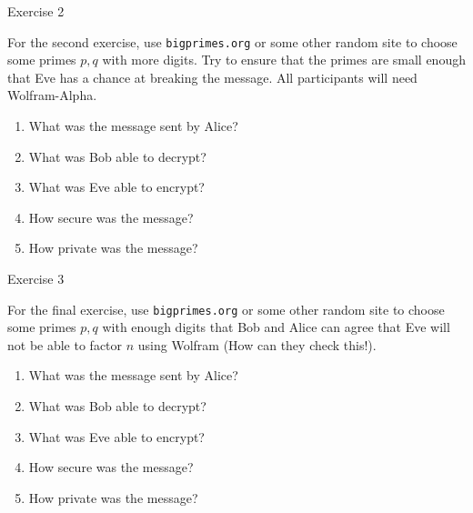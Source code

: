 \documentclass{article}
\begin{document}
\newpage

    \huge Exercise 2
    \normalsize

    For the second exercise, use \verb|bigprimes.org| or some other random site to choose some primes $p,q$ with more digits. Try to ensure that the primes are small enough that Eve has a chance at breaking the message. All participants will need Wolfram-Alpha.
    \begin{enumerate}
        \item What was the message sent by Alice? 
        \item What was Bob able to decrypt?
        \item What was Eve able to encrypt?
        \item How secure was the message?
        \item How private was the message?
    \end{enumerate}

    \newpage
    \huge Exercise 3
    \normalsize

    For the final exercise, use \verb|bigprimes.org| or some other random site to choose some primes $p,q$ with enough digits that Bob and Alice can agree that Eve will not be able to factor $n$ using Wolfram (How can they check this!). 
    \begin{enumerate}
        \item What was the message sent by Alice? 
        \item What was Bob able to decrypt?
        \item What was Eve able to encrypt?
        \item How secure was the message?
        \item How private was the message?
    \end{enumerate}
\end{document}
